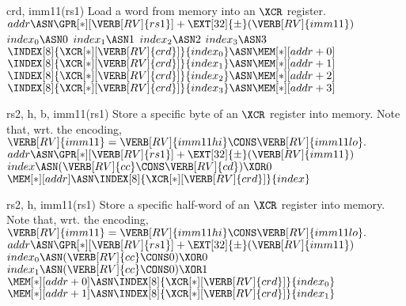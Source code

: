 
 {crd,        imm11(rs1)}{
  Load a      word from memory 
  into                         an $\XCR$ register.
}{
  $addr                                          \ASN \GPR[*][{\VERB[RV]{rs1}}] + \EXT[32]{\pm}( \VERB[RV]{imm11} )$ \;
  $index_0                                       \ASN                                            0$ \;
  $index_1                                       \ASN                                            1$ \;
  $index_2                                       \ASN                                            2$ \;
  $index_3                                       \ASN                                            3$ \;
  $\INDEX[8]{\XCR[*][{\VERB[RV]{crd}}]}{index_0} \ASN \MEM[*][{addr+0}]$ \;
  $\INDEX[8]{\XCR[*][{\VERB[RV]{crd}}]}{index_1} \ASN \MEM[*][{addr+1}]$ \;
  $\INDEX[8]{\XCR[*][{\VERB[RV]{crd}}]}{index_2} \ASN \MEM[*][{addr+2}]$ \;
  $\INDEX[8]{\XCR[*][{\VERB[RV]{crd}}]}{index_3} \ASN \MEM[*][{addr+3}]$ \;
}


 {rs2, h, b, imm11(rs1)}{
  Store a specific      byte of an $\XCR$ register into memory.
  Note that, wrt. the encoding,
  $
  \VERB[RV]{imm11} = \VERB[RV]{imm11hi} \CONS \VERB[RV]{imm11lo} .
  $
}{
  $addr            \ASN \GPR[*][{\VERB[RV]{rs1}}] + \EXT[32]{\pm}( \VERB[RV]{imm11} )$ \;
  $index           \ASN ( \VERB[RV]{cc} \CONS \VERB[RV]{cd} ) \XOR 0$ \;
  $\MEM[*][addr  ] \ASN \INDEX[8]{\XCR[*][{\VERB[RV]{crd}}]}{index  }$ \;
}


 {rs2, h,    imm11(rs1)}{
  Store a specific half-word of an $\XCR$ register into memory.
  Note that, wrt. the encoding,
  $
  \VERB[RV]{imm11} = \VERB[RV]{imm11hi} \CONS \VERB[RV]{imm11lo} .
  $
}{
  $addr            \ASN \GPR[*][{\VERB[RV]{rs1}}] + \EXT[32]{\pm}( \VERB[RV]{imm11} )$ \;
  $index_0         \ASN ( \VERB[RV]{cc} \CONS             0 ) \XOR 0$ \;
  $index_1         \ASN ( \VERB[RV]{cc} \CONS             0 ) \XOR 1$ \;
  $\MEM[*][addr+0] \ASN \INDEX[8]{\XCR[*][{\VERB[RV]{crd}}]}{index_0}$ \;
  $\MEM[*][addr+1] \ASN \INDEX[8]{\XCR[*][{\VERB[RV]{crd}}]}{index_1}$ \;
}


